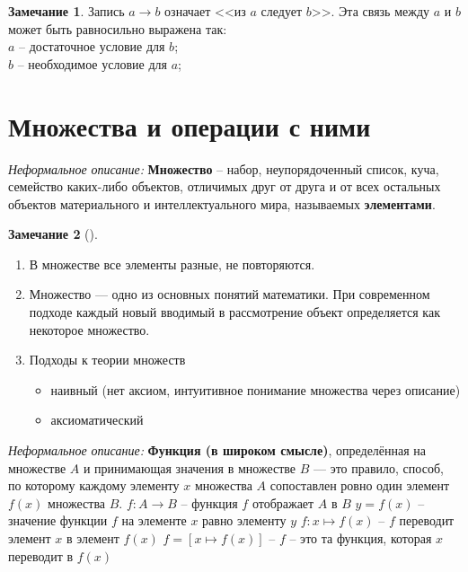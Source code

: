 \documentclass[12pt,oneside]{article}
\theoremstyle{definition}
\newtheorem{remark}{Замечание}[section]
\begin{document}
\begin{remark}
Запись $a\longrightarrow b$ означает <<из $a$ следует $b$>>. Эта связь между $a$ и $b$ может быть равносильно выражена так:
\\$a$ -- достаточное условие для $b$;
\\$b$ -- необходимое условие для $a$;
\end{remark}

\section{Множества и операции с ними}
{\it Неформальное описание: } \textbf{Множество} \--- набор, неупорядоченный список, куча, семейство каких-либо объектов, отличимых друг от друга и от всех остальных объектов материального и интеллектуального мира, называемых \textbf{элементами}.
\begin{remark}[]

\begin{enumerate}

    \item В множестве все элементы разные, не повторяются.
    \item Множество --- одно из основных понятий математики. При современном подходе каждый новый вводимый в рассмотрение объект определяется как некоторое множество.
    \item Подходы к теории множеств
        \begin{itemize}
            \item наивный (нет аксиом, интуитивное понимание множества через описание)
            \item аксиоматический
        \end{itemize}
\end{enumerate}
\end{remark}

{\it Неформальное описание: } \textbf{Функция (в широком смысле)}, определённая на множестве $A$ и принимающая значения в множестве $B$ --- это правило, способ, по которому каждому элементу $x$ множества $A$ сопоставлен ровно один элемент $f(x)$ множества $B$.
$f: A\longrightarrow B $ \--- функция $f$ отображает $A$ в $B$ \newline
$y=f(x)$ \--- значение функции $f$ на элементе $x$ равно элементу $y$ \newline
$f: x\mapsto f(x)$ \--- $f$ переводит элемент $x$ в элемент $f(x)$ \newline
$f = [x\mapsto f(x)]$ \--- $f$ \--- это та функция, которая $x$ переводит в $f(x)$ \newline 
\end{document}

